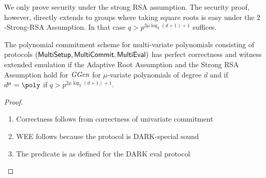 We only prove security under the strong RSA assumption. The security proof, however, directly extends to groups where taking square roots is easy under the $2$-Strong-RSA Assumption. In that case $q>p^{3\mu \log_2(d+1)+1}$ suffices.
\begin{theorem}
\label{thm:mvariate}
	The polynomial commitment scheme for multi-variate polynomials consisting of protocols $(\textsf{{MultiSetup}},\textsf{{MultiCommit}},\textsf{{MultiEval}})$ has perfect correctness and witness extended emulation if the Adaptive Root Assumption and the Strong RSA Assumption hold for $\textit{GGen}$ for $\mu$-variate polynomials of degree $d$ and if $d^\mu=\poly$ if $q> p^{2 \mu \log_2(d+1)+1}$.
\end{theorem}
\begin{proof}
\begin{enumerate}
	\item Correctness follows from correctness of univariate commitment
	\item WEE follows because the protocol is DARK-special sound
	\item The predicate is as defined for the DARK eval protocol 
\end{enumerate}	
\end{proof}



